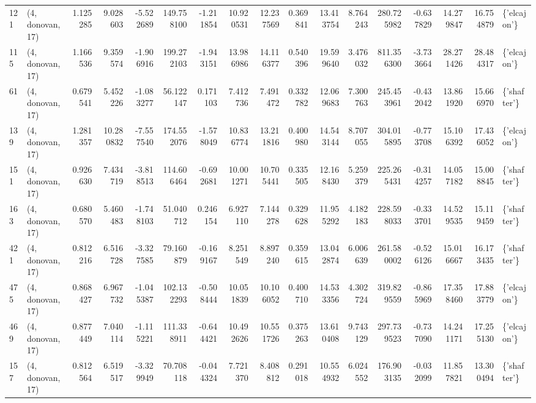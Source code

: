 \begin{tabular}{llrrrrrrrrrrrrrrl}
121 &  (4, donovan, 17) &   1.125285 &   9.028603 &  -5.522689 &   149.758100 &  -1.211854 &  10.920531 &  12.237569 &  0.369841 &  13.413754 &   8.764243 &   280.725982 &  -0.637829 &  14.279847 &  16.754879 &  \{'elcajon'\} \\
115 &  (4, donovan, 17) &   1.166536 &   9.359574 &  -1.906916 &   199.272103 &  -1.943151 &  13.986986 &  14.116377 &  0.540396 &  19.599640 &   3.476032 &   811.356300 &  -3.733664 &  28.271426 &  28.484317 &  \{'elcajon'\} \\
61  &  (4, donovan, 17) &   0.679541 &   5.452226 &  -1.083277 &    56.122147 &   0.171103 &   7.412736 &   7.491472 &  0.332782 &  12.069683 &   7.300763 &   245.453961 &  -0.432042 &  13.861920 &  15.666970 &  \{'shafter'\} \\
139 &  (4, donovan, 17) &   1.281357 &  10.280832 &  -7.557540 &   174.552076 &  -1.578049 &  10.836774 &  13.211816 &  0.400980 &  14.543144 &   8.707055 &   304.015895 &  -0.773708 &  15.106392 &  17.436052 &  \{'elcajon'\} \\
151 &  (4, donovan, 17) &   0.926630 &   7.434719 &  -3.818513 &   114.606464 &  -0.692681 &  10.001271 &  10.705441 &  0.335505 &  12.168430 &   5.259379 &   225.265431 &  -0.314257 &  14.057182 &  15.008845 &  \{'shafter'\} \\
163 &  (4, donovan, 17) &   0.680570 &   5.460483 &  -1.748103 &    51.040712 &   0.246154 &   6.927110 &   7.144278 &  0.329628 &  11.955292 &   4.182183 &   228.598033 &  -0.333701 &  14.529535 &  15.119459 &  \{'shafter'\} \\
421 &  (4, donovan, 17) &   0.812216 &   6.516728 &  -3.327585 &    79.160879 &  -0.169167 &   8.251549 &   8.897240 &  0.359615 &  13.042874 &   6.006639 &   261.580002 &  -0.526126 &  15.016667 &  16.173435 &  \{'shafter'\} \\
475 &  (4, donovan, 17) &   0.868427 &   6.967732 &  -1.045387 &   102.132293 &  -0.508444 &  10.051839 &  10.106052 &  0.400710 &  14.533356 &   4.302724 &   319.829559 &  -0.865969 &  17.358460 &  17.883779 &  \{'elcajon'\} \\
469 &  (4, donovan, 17) &   0.877449 &   7.040114 &  -1.115221 &   111.338911 &  -0.644421 &  10.492626 &  10.551726 &  0.375263 &  13.610408 &   9.743129 &   297.739523 &  -0.737090 &  14.241171 &  17.255130 &  \{'elcajon'\} \\
157 &  (4, donovan, 17) &   0.812564 &   6.519517 &  -3.329949 &    70.708118 &  -0.044324 &   7.721370 &   8.408812 &  0.291018 &  10.554932 &   6.024552 &   176.903135 &  -0.032099 &  11.857821 &  13.300494 &  \{'shafter'\} \\

\end{tabular}

